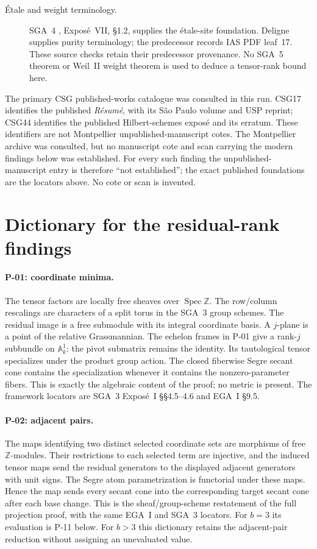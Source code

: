 \begin{description}
\item[\'Etale and weight terminology.]
SGA~4 \cite{SGA4}, Expos\'e~VII, \S1.2, supplies the
\'etale-site foundation. Deligne \cite[Definition~1.2.2,
p.~153]{WeilII} supplies purity terminology; the predecessor
records IAS PDF leaf~17. These source checks retain their
predecessor provenance. No SGA~5 theorem or Weil~II weight
theorem is used to deduce a tensor-rank bound here.
\end{description}

The primary CSG published-works catalogue \cite{CSGWorks}
was consulted in this run. CSG17 identifies the published
\emph{R\'esum\'e}, with its S\~ao Paulo volume and USP reprint;
CSG44 identifies the published Hilbert-schemes expos\'e and
its erratum. These identifiers are not Montpellier
unpublished-manuscript cotes. The Montpellier archive
\cite{MontpellierArchive} was consulted, but no manuscript
cote and scan carrying the modern findings below was
established. For every such finding the unpublished-manuscript
entry is therefore ``not established''; the exact published
foundations are the locators above. No cote or scan is invented.

\section{Dictionary for the residual-rank findings}

\paragraph{P-01: coordinate minima.}
The tensor factors are locally free sheaves over
$\operatorname{Spec}\mathbb Z$. The row/column rescalings
are characters of a split torus in the SGA~3 group schemes.
The residual image is a free submodule with its integral
coordinate basis. A $j$-plane is a point of the relative
Grassmannian. The echelon frames in P-01 give a rank-$j$
subbundle on $\mathbb A^1_k$: the pivot submatrix remains
the identity. Its tautological tensor specializes under
the product group action. The closed fiberwise Segre
secant cone contains the specialization whenever it
contains the nonzero-parameter fibers. This is exactly
the algebraic content of the proof; no metric is present.
The framework locators are SGA~3 Expos\'e~I \S\S4.5--4.6
and EGA~I \S9.5.

\paragraph{P-02: adjacent pairs.}
The maps identifying two distinct selected coordinate
sets are morphisms of free $\mathbb Z$-modules. Their
restrictions to each selected term are injective, and
the induced tensor maps send the residual generators
to the displayed adjacent generators with unit signs.
The Segre atom parametrization is functorial under these
maps. Hence the map sends every secant cone into the
corresponding target secant cone after each base change.
This is the sheaf/group-scheme restatement of the full
projection proof, with the same EGA~I and SGA~3 locators.
For $b=3$ its evaluation is P-11 below. For $b>3$
this dictionary retains the adjacent-pair reduction
without assigning an unevaluated value.

